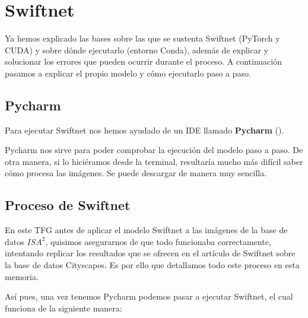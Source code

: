 \section{Swiftnet}

Ya hemos explicado las bases sobre las que se sustenta Swiftnet (PyTorch y CUDA) y sobre dónde ejecutarlo (entorno Conda), además de explicar y solucionar los errores que pueden ocurrir durante el proceso. A continuación pasamos a explicar el propio modelo y cómo ejecutarlo paso a paso.
\subsection{Pycharm}

Para ejecutar Swiftnet nos hemos ayudado de un \ac{IDE} llamado \textbf{Pycharm} (\cite{pycharm}).

Pycharm nos sirve para poder comprobar la ejecución del modelo paso a paso. De otra manera, si lo hiciéramos desde la terminal, resultaría mucho más difícil saber cómo procesa las imágenes. Se puede descargar de manera muy sencilla.

\subsection{Proceso de Swiftnet}
En este TFG antes de aplicar el modelo Swiftnet a las imágenes de la base de datos $ISA^2$, quisimos asegurarnos de que todo funcionaba correctamente, intentando replicar los resultados que se ofrecen en el artículo de Swiftnet sobre la base de datos Cityscapes. Es por ello que detallamos todo este proceso en esta memoria.

Así pues, una vez tenemos Pycharm podemos pasar a ejecutar Swiftnet, el cual funciona de la siguiente manera:

